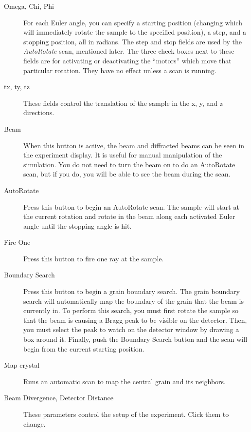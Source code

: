 \documentclass{article}
\begin{document}
	\begin{description}

		\item[Omega, Chi, Phi] For each Euler angle, you can specify a
		starting position (changing which will immediately rotate the
		sample to the specified position), a step, and a stopping
		position, all in radians.  The step and stop fields are used
		by the {\em AutoRotate } scan, mentioned later. The three
		check boxes next to these fields are for activating or
		deactivating the ``motors'' which move that particular
		rotation.  They have no effect unless a scan is running. 

		\item[tx, ty, tz] These fields control the translation of the
		sample in the x, y, and z directions. 

		\item[Beam] When this button is active, the beam and
		diffracted beams can be seen in the experiment display.  It is
		useful for manual manipulation of the simulation.  You do not
		need to turn the beam on to do an AutoRotate scan, but if you
		do, you will be able to see the beam during the scan. 

		\item[AutoRotate] Press this button to begin an AutoRotate
		scan.  The sample will start at the current rotation and
		rotate in the beam along each activated Euler angle until the stopping
		angle is hit.

		\item[Fire One] Press this button to fire one ray at the
		sample.

		\item[Boundary Search] Press this button to begin a grain
		boundary search. The grain boundary search will automatically
		map the boundary of the grain that the beam is currently in.
		To perform this search, you must first rotate the sample so
		that the beam is causing a Bragg peak to be visible on the
		detector.  Then, you must select the peak to watch on the
		detector window by drawing a box around it.  Finally, push the
		Boundary Search button and the scan will begin from the
		current starting position.

		\item[Map crystal] Runs an automatic scan to map the central 
		grain and its neighbors.

		\item[Beam Divergence, Detector Distance] These
		parameters control the setup of the experiment.  Click them to
		change.


\end{description}
\end{document}
